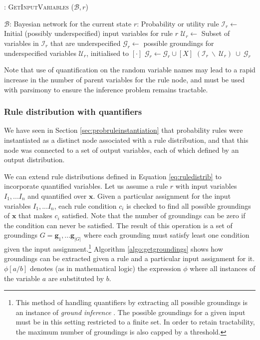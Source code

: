 \begin{algorithm}[h!]
\caption{: \textsc{GetInputVariables} ($\mathcal{B}, r$)}
\begin{algorithmic}[1] \vspace{1mm}
\REQUIRE $\mathcal{B}$: Bayesian network for the current state
\REQUIRE $r$: Probability or utility rule  \vspace{1mm}
\STATE $\mathcal{I}_{r} \leftarrow $ Initial (possibly underspecified) input variables for rule $r$
\STATE $\mathcal{U}_{r} \leftarrow $ Subset of variables in $\mathcal{I}_{r}$ that are underspecified
\STATE $\mathcal{G}_{r} \leftarrow$ possible groundings for underspecified variables $\mathcal{U}_{r}$, initialised to $[ \cdot ]$
\STATE $\mathcal{G}_{r} \leftarrow \mathcal{G}_{r} \cup [X]$
\ENDIF
\ENDFOR
\ENDFOR
\RETURN $(\mathcal{I}_{r} \ \backslash \ \mathcal{U}_{r}) \ \cup \  \mathcal{G}_{r}$
\end{algorithmic}
\label{algo:getinputvariables}
\end{algorithm}

Note that use of quantification on the random variable names may lead to a rapid increase in the number of parent variables for the rule node, and must be used with parsimony to ensure the inference problem remains tractable.  

\subsubsection*{Rule distribution with quantifiers}

We have seen in Section \ref{sec:probruleinstantiation} that probability rules were instantiated as a distinct node associated with a rule distribution, and that this node was connected to a set of output variables, each of which defined by an output distribution.  

 We can extend rule distributions defined in Equation \eqref{eq:ruledistrib} to incorporate quantified variables.  Let us assume a rule $r$ with input variables $I_1,...I_n$ and quantified over $\mathbf{x}$.  Given a particular assignment for the input variables $I_1,...I_n$, each rule condition $c_i$ is checked to find all possible groundings of $\mathbf{x}$  that makes $c_i$ satisfied.  Note that the number of groundings can be zero if the condition can never be satisfied. The result of this operation is a set of groundings $G= \mathbf{g}_1,...\mathbf{g}_{|G|}$ where each grounding must satisfy least one condition given the input assignment.\footnote{This method of handling quantifiers by extracting all possible groundings is an instance of \textit{ground inference} \citep{getoor:srlbook07}. The possible groundings for a given input must be in this setting restricted to a finite set. In order to retain tractability, the maximum number of groundings is also capped by a threshold.} Algorithm \ref{algo:getgroundings} shows how groundings can be extracted given a rule and a particular input assignment for it. $\phi[a/b]$ denotes (as in mathematical logic) the expression $\phi$ where all instances of the variable $a$ are substituted by $b$.
 
